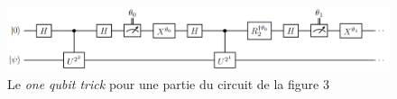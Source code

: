 \begin{figure}[H]
    \centering
    \includegraphics[scale=0.44]{images/one_qubit_trick.png}
    \caption{Le \textit{one qubit trick} pour une partie du circuit de la figure 3}
\end{figure}